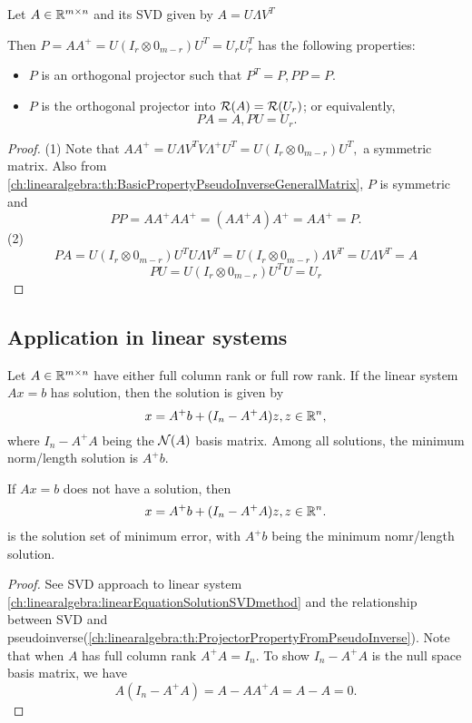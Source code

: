 \begin{refsection}
\begin{lemma}\label{ch:linearalgebra:th:ProjectorPropertyFromPseudoInverseGeneralSystem}\hfill
Let $A\in \mathbb{R}^{m\times n}$ and its SVD given by $A = U\Lambda V^T$	

		Then $P = AA^+ = U(I_r\otimes 0_{m-r})U^T = U_rU^T_r$ has the following properties:
		\begin{itemize}
			\item $P$ is an orthogonal projector such that $P^T = P, PP = P.$
			\item $P$ is the orthogonal projector into $\mathcal{R}(A) = \mathcal{R}(U_r)$; or equivalently, $$PA  = A, PU = U_r.$$
		\end{itemize}
\end{lemma}
\begin{proof}
	(1) 
	Note that $AA^+ =  U\Lambda V^T V \Lambda^+ U^T = U(I_r\otimes 0_{m-r})U^T,$
	a symmetric matrix.
	Also from \autoref{ch:linearalgebra:th:BasicPropertyPseudoInverseGeneralMatrix}, $P$ is symmetric and 
	$$PP = AA^+AA^+ =(AA^+A)A^+= AA^+ = P.$$
	(2) $$PA = U(I_r\otimes 0_{m-r})U^T U\Lambda V^T = U(I_r\otimes 0_{m-r})\Lambda V^T =U\Lambda V^T = A$$
	$$PU = U(I_r\otimes 0_{m-r})U^T U = U_r$$
\end{proof}

\subsection{Application in linear systems}

\begin{lemma}
Let $A \in \mathbb{R}^{m\times n}$ have either full column rank or full row rank. If the linear system $Ax = b$ has solution, then the solution is given by
$$x = A^+b + (I_n - A^+A)z, z\in \mathbb{R}^n,$$
where $I_n - A^+A$ being the $\mathcal{N}(A)$ basis matrix.
Among all solutions, the minimum norm/length solution is $A^+b$.

If $Ax = b$ does not have a solution, then
$$x = A^+b + (I_n - A^+A)z, z\in \mathbb{R}^n.$$
is the solution set of minimum error, with $A^+b$ being the minimum nomr/length solution.
\end{lemma}
\begin{proof}
See SVD approach to linear system \autoref{ch:linearalgebra:linearEquationSolutionSVDmethod} and the relationship between SVD and pseudoinverse(\autoref{ch:linearalgebra:th:ProjectorPropertyFromPseudoInverse}). Note that when $A$ has full column rank $A^+A =I_n$. 
To show  $I_n - A^+A$ is the null space basis matrix, we have
$$A(I_n - A^+A) = A - AA^+A = A - A = 0.$$


\end{proof}
\end{refsection}
